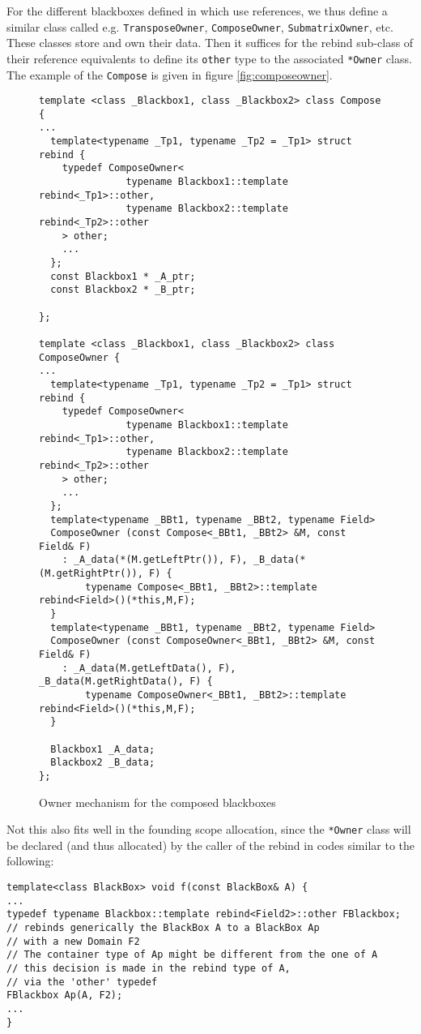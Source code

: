 For the different blackboxes defined in \linbox which use references,
we thus define a similar class called e.g. \texttt{TransposeOwner},
\texttt{ComposeOwner}, \texttt{SubmatrixOwner}, etc.
These classes store and own their data. Then it suffices for the
rebind sub-class of their reference equivalents to define its
\texttt{other} type to the associated \verb!*Owner! class. The example
of the \texttt{Compose} is given in figure \ref{fig:composeowner}.
\begin{figure}[htbp]
\begin{verbatim}
template <class _Blackbox1, class _Blackbox2> class Compose {
...
  template<typename _Tp1, typename _Tp2 = _Tp1> struct rebind {
    typedef ComposeOwner<
               typename Blackbox1::template rebind<_Tp1>::other,
               typename Blackbox2::template rebind<_Tp2>::other
    > other;
    ...
  };
  const Blackbox1 * _A_ptr;
  const Blackbox2 * _B_ptr;
  
};

template <class _Blackbox1, class _Blackbox2> class ComposeOwner {
...
  template<typename _Tp1, typename _Tp2 = _Tp1> struct rebind {
    typedef ComposeOwner<
               typename Blackbox1::template rebind<_Tp1>::other,
               typename Blackbox2::template rebind<_Tp2>::other
    > other;
    ...
  };
  template<typename _BBt1, typename _BBt2, typename Field>
  ComposeOwner (const Compose<_BBt1, _BBt2> &M, const Field& F)
    : _A_data(*(M.getLeftPtr()), F), _B_data(*(M.getRightPtr()), F) {
        typename Compose<_BBt1, _BBt2>::template rebind<Field>()(*this,M,F);
  }
  template<typename _BBt1, typename _BBt2, typename Field>
  ComposeOwner (const ComposeOwner<_BBt1, _BBt2> &M, const Field& F)
    : _A_data(M.getLeftData(), F), _B_data(M.getRightData(), F) {
        typename ComposeOwner<_BBt1, _BBt2>::template rebind<Field>()(*this,M,F);
  }

  Blackbox1 _A_data;
  Blackbox2 _B_data;
};
\end{verbatim}
\caption{Owner mechanism for the composed blackboxes}
\end{figure}

Not this also fits well in the \linbox
founding scope allocation, since the \verb!*Owner! class will be
declared (and thus allocated) by the caller of the rebind in codes
similar to the following:
\begin{verbatim}
template<class BlackBox> void f(const BlackBox& A) {
...
typedef typename Blackbox::template rebind<Field2>::other FBlackbox;
// rebinds generically the BlackBox A to a BlackBox Ap 
// with a new Domain F2
// The container type of Ap might be different from the one of A
// this decision is made in the rebind type of A, 
// via the 'other' typedef
FBlackbox Ap(A, F2);
...
}
\end{verbatim}

